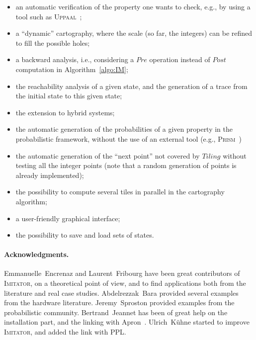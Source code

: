 \documentclass[a4paper,10pt]{article}
\newcommand{\tiling}{\mathit{Tiling}}
\newcommand{\imitator}{\textsc{Imitator}}
\newcommand{\prism}{\textsc{Prism}}
\newcommand{\uppaal}{\textsc{Uppaal}}
\begin{document}
\begin{itemize}
	\item an automatic verification of the property one wants to check, e.g., by using a tool such as \uppaal{}~\cite{lpy97};
	\item a ``dynamic'' cartography, where the scale (so far, the integers) can be refined to fill the possible holes;
	\item a backward analysis, i.e., considering a $\mathit{Pre}$ operation instead of $\mathit{Post}$ computation in Algorithm~\ref{algo:IM};
	\item the reachability analysis of a given state, and the generation of a trace from the initial state to this given state;
	\item the extension to hybrid systems;
	\item the automatic generation of the probabilities of a given property in the probabilistic framework, without the use of an external tool (e.g., \prism{}~\cite{hknp06})
	\item the automatic generation of the ``next point'' not covered by $\tiling$ without testing all the integer points (note that a random generation of points is already implemented);
	\item the possibility to compute several tiles in parallel in the cartography algorithm;
	\item a user-friendly graphical interface;
	\item the possibility to save and load sets of states.
\end{itemize}


\paragraph{Acknowledgments.}

Emmanuelle~Encrenaz and Laurent~Fribourg have been great contributors of \imitator{}, on a theoretical point of view, and to find applications both from the literature and real case studies.
Abdelrezzak~Bara provided several examples from the hardware literature.
Jeremy~Sproston provided examples from the probabilistic community.
Bertrand~Jeannet has been of great help on the installation part, and the linking with Apron~\cite{jm09}.
Ulrich~K\"uhne started to improve \imitator{}, and added the link with PPL.
\end{document}
